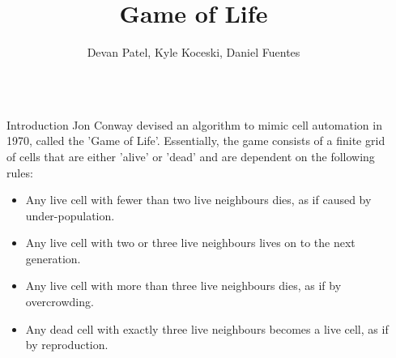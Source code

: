 \documentclass[final]{beamer}
\title{Game of Life} %
\author{Devan Patel, Kyle Koceski, Daniel Fuentes} %
\institute{CIS 4930: Concurrent Programming} %
\newlength{\sepwid}
\newlength{\onecolwid}
\begin{document}

\setlength{\belowcaptionskip}{2ex} %
\setlength\belowdisplayshortskip{2ex} %

\begin{frame}[t] %

\begin{columns}[t] %

\begin{column}{\sepwid}\end{column} %

\begin{column}{\onecolwid} %



\begin{alertblock}{Introduction}
Jon Conway devised an algorithm to mimic cell automation in 1970, called the 'Game of Life'. Essentially, the game consists of a finite grid of cells that are either 'alive' or 'dead' and are dependent on the following rules:
\begin{itemize}
\item Any live cell with fewer than two live neighbours dies, as if caused by under-population.
\item Any live cell with two or three live neighbours lives on to the next generation.
\item Any live cell with more than three live neighbours dies, as if by overcrowding.
\item Any dead cell with exactly three live neighbours becomes a live cell, as if by reproduction.
\end{itemize}

\end{alertblock}




\end{column}
\end{columns}
\end{frame}
\end{document}
